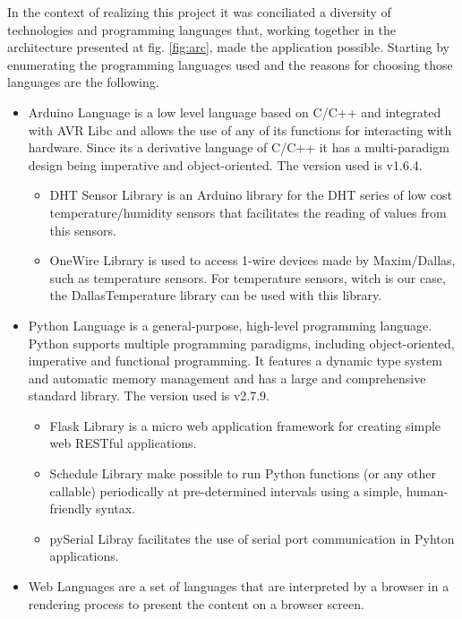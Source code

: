 \documentclass[12pt]{report}
\begin{document}
In the context of realizing this project it was conciliated a diversity of technologies and programming languages that, working together in the architecture presented at fig. \ref{fig:arc}, made the application possible. Starting by enumerating the programming languages used and the reasons for choosing those languages are the following.
\begin{itemize}
\item Arduino Language\cite{arduinolang} is a low level language based on C/C++ and integrated with AVR Libc\cite{avr} and allows the use of any of its functions for interacting with hardware. Since its a derivative language of C/C++ it has a multi-paradigm design being imperative and object-oriented. The version used is v1.6.4. 
\begin{itemize}
\item DHT Sensor Library\cite{dhtada} is an Arduino library for the DHT series of low cost temperature/humidity sensors that facilitates the reading of values from this sensors.
\item OneWire Library\cite{pjrc} is used to access 1-wire devices made by Maxim/Dallas, such as temperature sensors. For temperature sensors, witch is our case, the DallasTemperature\cite{dallas} library can be used with this library.
\end{itemize}
\item Python Language\cite{pylang} is a general-purpose, high-level programming language. Python supports multiple programming paradigms, including object-oriented, imperative and functional programming. It features a dynamic type system and automatic memory management and has a large and comprehensive standard library. The version used is v2.7.9.
\begin{itemize}
\item Flask Library\cite{flask} is a micro web application framework for creating simple web RESTful applications.
\item Schedule Library\cite{schedule} make possible to run Python functions (or any other callable) periodically at pre-determined intervals using a simple, human-friendly syntax.
\item pySerial Libray\cite{pyserial} facilitates the use of serial port communication in Pyhton applications.
\end{itemize}
\item Web Languages\cite{moz} are a set of languages that are interpreted by a browser in a rendering process to present the content on a browser screen. 
\begin{itemize}

\end{itemize}
\end{itemize}
\end{document}
